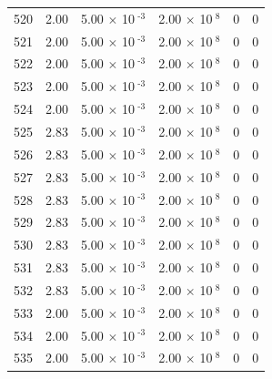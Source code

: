 \documentclass[a4paper,11pt]{article}
\begin{document}
\begin{center}
\begin{longtable}{|R{1.5cm}|R{2.4cm}|R{2.4cm}|R{2.4cm}|R{2.4cm}|R{2.4cm}|}
  520 &   2.00  &         5.00 $\times$ 10$^{\text{          -3}}$  &         2.00 $\times$ 10$^{\text{           8}}$  & 0  & 0 \\
  521 &   2.00  &         5.00 $\times$ 10$^{\text{          -3}}$  &         2.00 $\times$ 10$^{\text{           8}}$  & 0  & 0 \\
  522 &   2.00  &         5.00 $\times$ 10$^{\text{          -3}}$  &         2.00 $\times$ 10$^{\text{           8}}$  & 0  & 0 \\
  523 &   2.00  &         5.00 $\times$ 10$^{\text{          -3}}$  &         2.00 $\times$ 10$^{\text{           8}}$  & 0  & 0 \\
  524 &   2.00  &         5.00 $\times$ 10$^{\text{          -3}}$  &         2.00 $\times$ 10$^{\text{           8}}$  & 0  & 0 \\
  525 &   2.83  &         5.00 $\times$ 10$^{\text{          -3}}$  &         2.00 $\times$ 10$^{\text{           8}}$  & 0  & 0 \\
  526 &   2.83  &         5.00 $\times$ 10$^{\text{          -3}}$  &         2.00 $\times$ 10$^{\text{           8}}$  & 0  & 0 \\
  527 &   2.83  &         5.00 $\times$ 10$^{\text{          -3}}$  &         2.00 $\times$ 10$^{\text{           8}}$  & 0  & 0 \\
  528 &   2.83  &         5.00 $\times$ 10$^{\text{          -3}}$  &         2.00 $\times$ 10$^{\text{           8}}$  & 0  & 0 \\
  529 &   2.83  &         5.00 $\times$ 10$^{\text{          -3}}$  &         2.00 $\times$ 10$^{\text{           8}}$  & 0  & 0 \\
  530 &   2.83  &         5.00 $\times$ 10$^{\text{          -3}}$  &         2.00 $\times$ 10$^{\text{           8}}$  & 0  & 0 \\
  531 &   2.83  &         5.00 $\times$ 10$^{\text{          -3}}$  &         2.00 $\times$ 10$^{\text{           8}}$  & 0  & 0 \\
  532 &   2.83  &         5.00 $\times$ 10$^{\text{          -3}}$  &         2.00 $\times$ 10$^{\text{           8}}$  & 0  & 0 \\
  533 &   2.00  &         5.00 $\times$ 10$^{\text{          -3}}$  &         2.00 $\times$ 10$^{\text{           8}}$  & 0  & 0 \\
  534 &   2.00  &         5.00 $\times$ 10$^{\text{          -3}}$  &         2.00 $\times$ 10$^{\text{           8}}$  & 0  & 0 \\
  535 &   2.00  &         5.00 $\times$ 10$^{\text{          -3}}$  &         2.00 $\times$ 10$^{\text{           8}}$  & 0  & 0 \\

\end{longtable}
\end{center}
\end{document}
